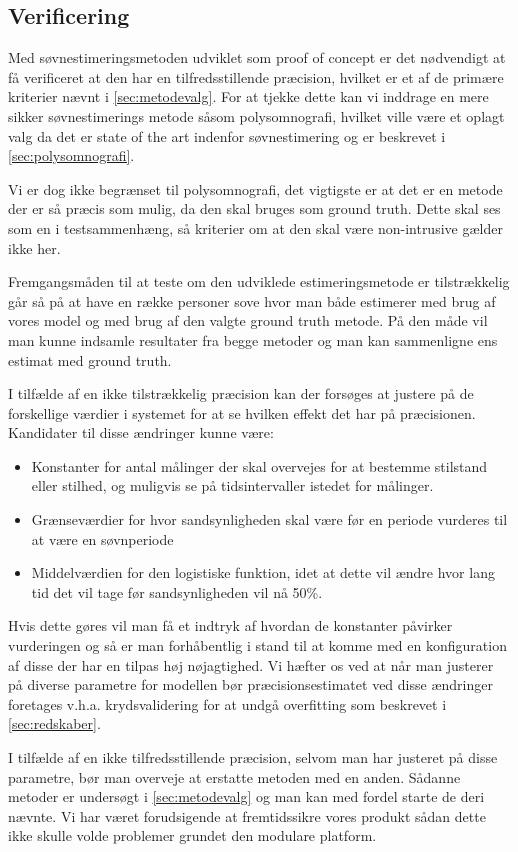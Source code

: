 \subsection{Verificering}
Med søvnestimeringsmetoden udviklet som proof of concept er det nødvendigt at få verificeret at den har en tilfredsstillende præcision, hvilket er et af de primære kriterier nævnt i \cref{sec:metodevalg}.
For at tjekke dette kan vi inddrage en mere sikker søvnestimerings metode såsom polysomnografi, hvilket ville være et oplagt valg da det er state of the art indenfor søvnestimering og er beskrevet i \cref{sec:polysomnografi}.

Vi er dog ikke begrænset til polysomnografi, det vigtigste er at det er en metode der er så præcis som mulig, da den skal bruges som ground truth.
Dette skal ses som en i testsammenhæng, så kriterier om at den skal være non-intrusive gælder ikke her.

Fremgangsmåden til at teste om den udviklede estimeringsmetode er tilstrækkelig går så på at have en række personer sove hvor man både estimerer med brug af vores model og med brug af den valgte ground truth metode.
På den måde vil man kunne indsamle resultater fra begge metoder og man kan sammenligne ens estimat med ground truth.

I tilfælde af en ikke tilstrækkelig præcision kan der forsøges at justere på de forskellige værdier i systemet for at se hvilken effekt det har på præcisionen.
Kandidater til disse ændringer kunne være:
\begin{itemize}
	\item Konstanter for antal målinger der skal overvejes for at bestemme stilstand eller stilhed, og muligvis se på tidsintervaller istedet for målinger.
	\item Grænseværdier for hvor sandsynligheden skal være før en periode vurderes til at være en søvnperiode
	\item Middelværdien for den logistiske funktion, idet at dette vil ændre hvor lang tid det vil tage før sandsynligheden vil nå 50\%.
\end{itemize} 

Hvis dette gøres vil man få et indtryk af hvordan de konstanter påvirker vurderingen og så er man forhåbentlig i stand til at komme med en konfiguration af disse der har en tilpas høj nøjagtighed.
Vi hæfter os ved at når man justerer på diverse parametre for modellen bør præcisionsestimatet ved disse ændringer foretages v.h.a. krydsvalidering for at undgå overfitting som beskrevet i \cref{sec:redskaber}.

I tilfælde af en ikke tilfredsstillende præcision, selvom man har justeret på disse parametre, bør man overveje at erstatte metoden med en anden.
Sådanne metoder er undersøgt i \cref{sec:metodevalg} og man kan med fordel starte de deri nævnte.
Vi har været forudsigende at fremtidssikre vores produkt sådan dette ikke skulle volde problemer grundet den modulare platform.